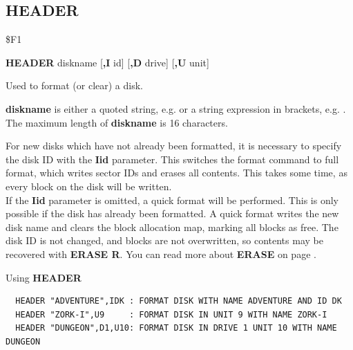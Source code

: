 \subsection{HEADER}
\begin{description}[leftmargin=2cm,style=nextline]
\item [Token:] \$F1
\item [Format:] {\bf HEADER} diskname [{\bf,I} id] [{\bf,D} drive] [{\bf,U} unit]
\item [Usage:]
   Used to format (or clear) a disk.

   {\bf diskname} is either a quoted string, e.g.  or
   a string expression in brackets, e.g. .
   The maximum length of {\bf diskname} is 16 characters.

   \drivedefinition

   \unitdefinition

\item [Remarks:]
   For new disks which have not already been formatted,
   it is necessary to specify the disk ID with the
   {\bf Iid} parameter. This switches the format command to
   full format, which writes sector IDs and erases all contents.
   This takes some time, as every block on the disk will
   be written. \\
   If the {\bf Iid} parameter is omitted, a quick format will
   be performed. This is only possible if the disk has already been formatted.
   A quick format writes the new disk name and clears the
   block allocation map, marking all blocks as free.
   The disk ID is not changed, and blocks are not overwritten,
   so contents may be recovered with {\bf ERASE R}.
   You can read more about {\bf ERASE} on page \pageref{erasecommand}.

\item [Examples:] Using {\bf HEADER}
\begin{tcolorbox}[colback=black,coltext=white]
\verbatimfont{\codefont}
\begin{verbatim}
  HEADER "ADVENTURE",IDK : FORMAT DISK WITH NAME ADVENTURE AND ID DK
  HEADER "ZORK-I",U9     : FORMAT DISK IN UNIT 9 WITH NAME ZORK-I
  HEADER "DUNGEON",D1,U10: FORMAT DISK IN DRIVE 1 UNIT 10 WITH NAME DUNGEON
\end{verbatim}
\end{tcolorbox}
\end{description}


\newpage
